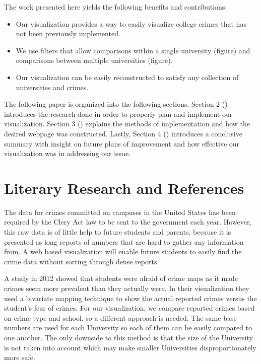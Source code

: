 \documentclass[journal]{vgtc}                %
\begin{document}
The work presented here yields the following benefits and contributions:
\begin{itemize}
\setlength\itemsep{0em}
\item Our visualization provides a way to easily visualize college crimes that has not been previously implemented.
\item We use filters that allow comparisons within a single university (figure) and comparisons between multiple universities (figure).
\item Our visualization can be easily reconstructed to satisfy any collection of universities and crimes.
\end{itemize}
\indent The following paper is organized into the following sections.  Section 2 () introduces the research done in order to properly plan and implement our visualization. Section 3 () explains the methods of implementation and how the desired webpage was constructed. Lastly, Section 4 () introduces a conclusive summary with insight on future plans of improvement and how effective our visualization was in addressing our issue.\\

\section{Literary Research and References} \label{research}
The data for crimes committed on campuses in the United States has been required by the Clery Act law to be sent to the government each year.  However, this raw data is of little help to future students and parents, because it is presented as long reports of numbers that are hard to gather any information from\cite{lipka-2011}.  A web based visualization will enable future students to easily find the crime data without sorting through dense reports.

A study in 2012 showed that students were afraid of crime maps as it made crimes seem more prevalent than they actually were\cite{fuhrmann-huynh-scholz-2013}. In their visualization they used a bivariate mapping technique to show the actual reported crimes versus the student’s fear of crimes.  For our visualization, we compare reported crimes based on crime type and school, so a different approach is needed.  The same base numbers are used for each University so each of them can be easily compared to one another.  The only downside to this method is that the size of the University is not taken into account which may make smaller Universities disproportionately more safe.
\end{document}
